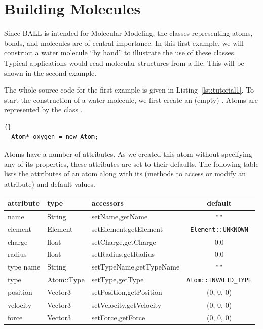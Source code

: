 \section{Building Molecules}

Since BALL is intended for Molecular Modeling, the classes representing atoms,
bonds, and molecules are of central importance. In this first example, we will
construct a water molecule ``by hand'' to illustrate the use of these classes.
Typical applications would read molecular structures from a file. This will be
shown in the second example.

\noindent
The whole source code for the first example is given in
Listing~\ref{lst:tutorial1}. To start the construction of a water molecule, we
first create an (empty) . Atoms are represented by the class
.

\begin{lstlisting}{}
  Atom* oxygen = new Atom;
\end{lstlisting}
	
\noindent
Atoms have a number of attributes. As we created this atom without specifying
any of its properties, these attributes are set to their defaults. The
following table lists the attributes of an atom along with its
 (methods to access or modify an attribute) and default
values.
\begin{center}
  \begin{tabular}{lllc}
  attribute   &	type       & accessors               & default\\
  \hline
  name        & String     & setName,getName         & {\tt ""}\\
  element     & Element    & setElement,getElement   & {\tt Element::UNKNOWN}\\
  charge      & float      & setCharge,getCharge     & 0.0\\
  radius      & float      & setRadius,getRadius     & 0.0\\
  type name   & String     & setTypeName,getTypeName & {\tt ""}\\
  type        & Atom::Type & setType,getType         & {\tt Atom::INVALID\_TYPE}\\
  position    & Vector3    & setPosition,getPosition & (0, 0, 0)\\
  velocity    & Vector3    & setVelocity,getVelocity & (0, 0, 0)\\
  force       & Vector3    & setForce,getForce       & (0, 0, 0)
  \end{tabular}
\end{center}

